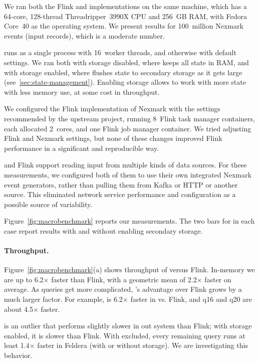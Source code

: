 We ran both the Flink and \dbsp implementations on the same machine,
which has a 64-core, 128-thread Threadripper~3990X CPU and 256~GB RAM,
with Fedora Core~40 as the operating system. We present results for
100~million Nexmark events (input records), which is a moderate
number.

\dbsp runs as a single process with 16~worker threads, and otherwise
with default settings.  We ran \dbsp both with storage disabled, where
\dbsp keeps all state in RAM, and with storage enabled, where \dbsp
flushes state to secondary storage as it gets large
(see~\ref{sec:state-management}).  Enabling storage allows \dbsp to
work with more state with less memory use, at some cost in throughput.

We configured the Flink implementation of Nexmark with the settings
recommended by the upstream project, running 8~Flink task manager
containers, each allocated 2~cores, and one Flink job manager
container.  We tried adjusting Flink and Nexmark settings, but none of
these changes improved Flink performance in a significant and
reproducible way.

\dbsp and Flink support reading input from multiple kinds of data
sources.  For these measurements, we configured both of them to use
their own integrated Nexmark event generators, rather than pulling
them from Kafka or HTTP or another source.  This eliminated network
service performance and configuration as a possible source of
variability.

Figure~\ref{fig:macrobenchmark} reports our measurements.  The two
bars for \dbsp in each case report results with and without enabling
secondary storage.

\paragraph{Throughput.}

\newcommand{\x}{\(\times\)}

Figure~\ref{fig:macrobenchmark}(a) shows throughput of \dbsp versus
Flink.  In-memory we are up to 6.2\x{} faster than Flink, with a
geometric mean of 2.2\x{} faster on average.  As queries get more
complicated, \dbsp's advantage over Flink grows by a much larger
factor.  For example,  is 6.2\x{} faster in \dbsp vs. Flink,
and q16 and q20 are about 4.5\x{} faster.

 is an outlier that performs slightly slower in out system
than Flink; with storage enabled, it is slower than Flink.  With
 excluded, every remaining query runs at least 1.4\x{}
faster in Feldera (with or without storage).  We are investigating
this behavior.

